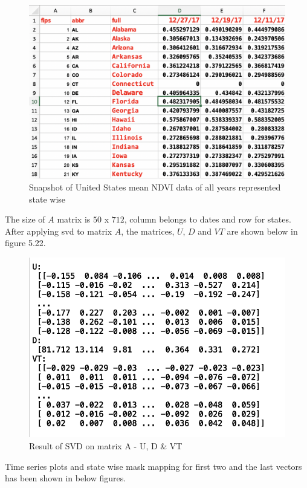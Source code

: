   \begin{figure}[H]
            \centering
            \includegraphics[width=1.0\linewidth]{figures/ch5/svd_data_snapshot.png}
            \caption{\label{fig:svd_data_snapshot} Snapshot of United States mean NDVI data of all years represented state wise}
    \end{figure}

The size of $A$ matrix is $50$ x $712$, column belongs to dates and row for states. After applying \gls{svd} to matrix $A$, the matrices, $U$, $D$ and $VT$ are shown below in figure 5.22.

    \begin{figure}[H]
            \centering
            \includegraphics[width=0.85\linewidth]{figures/ch5/svd_result_matrix.png}
            \caption{\label{fig:svd_result_matrices} Result of SVD on matrix A - U, D \& VT}
    \end{figure}
    
    Time series plots and state wise mask mapping for first two and the last vectors has been shown in below figures.
    
